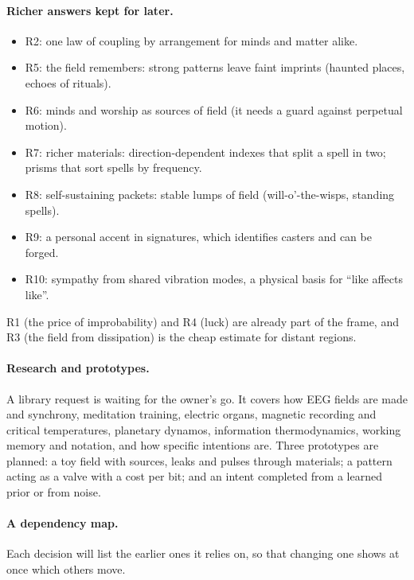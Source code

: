 \documentclass[11pt,a4paper]{article}
\begin{document}
\paragraph{Richer answers kept for later.}
\begin{itemize}
  \item R2: one law of coupling by arrangement for minds and matter alike.
  \item R5: the field remembers: strong patterns leave faint imprints (haunted places, echoes of rituals).
  \item R6: minds and worship as sources of field (it needs a guard against perpetual motion).
  \item R7: richer materials: direction-dependent indexes that split a spell in two; prisms that sort spells by frequency.
  \item R8: self-sustaining packets: stable lumps of field (will-o'-the-wisps, standing spells).
  \item R9: a personal accent in signatures, which identifies casters and can be forged.
  \item R10: sympathy from shared vibration modes, a physical basis for ``like affects like''.
\end{itemize}
R1 (the price of improbability) and R4 (luck) are already part of the frame, and R3 (the field from dissipation) is the cheap estimate for distant regions.

\paragraph{Research and prototypes.} A library request is waiting for the owner's go. It covers how EEG fields are made and synchrony, meditation training, electric organs, magnetic recording and critical temperatures, planetary dynamos, information thermodynamics, working memory and notation, and how specific intentions are. Three prototypes are planned: a toy field with sources, leaks and pulses through materials; a pattern acting as a valve with a cost per bit; and an intent completed from a learned prior or from noise.

\paragraph{A dependency map.} Each decision will list the earlier ones it relies on, so that changing one shows at once which others move.
\end{document}
